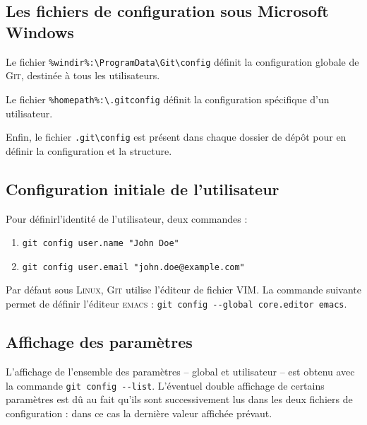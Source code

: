 \documentclass[11pt,twoside,headings=normal,open=right,french,DIV=12]{scrreprt}
\newcommand{\git}{\textsc{Git}}
\newcommand{\spec}[1]{\texttt{#1}}
\begin{document}
\subsection{Les fichiers de configuration sous Microsoft Windows}



    Le fichier \spec{\%windir\%:\textbackslash{}ProgramData\textbackslash{}Git\textbackslash{}config} définit la configuration
    globale de \git, destinée à tous les utilisateurs.
    
    Le fichier \spec{\%homepath\%:\textbackslash.gitconfig} définit la configuration spécifique d'un utilisateur.
    
    Enfin, le fichier \spec{.git\textbackslash config} est présent dans chaque dossier de dépôt pour en définir la configuration
    et la structure.    



\subsection{Configuration initiale de l'utilisateur}



    Pour définirl'identité de l'utilisateur, deux commandes :
    \begin{enumerate}
        \item \verb|git config user.name "John Doe"|
        \item \verb|git config user.email "john.doe@example.com"|
    \end{enumerate}

    Par défaut sous \textsc{Linux}, \git{} utilise l'éditeur de fichier \textsc{VIM}. La commande suivante permet de
    définir l'éditeur \textsc{emacs} : \verb|git config --global core.editor emacs|.



\subsection{Affichage des paramètres}

    
    
    L'affichage de l'ensemble des paramètres -- global et utilisateur -- est obtenu avec la commande
    \verb|git config --list|. L'éventuel double affichage de certains paramètres est dû au fait qu'ils sont successivement
    lus dans les deux fichiers de configuration : dans ce cas la dernière valeur affichée prévaut.

    \smallskip
    
\end{document}
